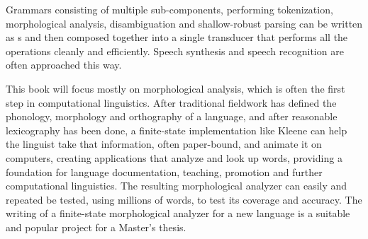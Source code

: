 Grammars consisting of multiple sub-components, performing tokenization, morphological
analysis, disambiguation and shallow-robust parsing can be written as \fst{}s and then
composed together into a single transducer that performs all the operations cleanly and
efficiently.  Speech synthesis and speech recognition are often approached this way.

This book will focus mostly on morphological analysis, which is often the first step in
computational linguistics.  After traditional fieldwork has defined the phonology,
morphology and orthography of a language, and after reasonable lexicography has been done,
a finite-state implementation like Kleene can help the linguist take that information, often paper-bound,
and animate it on
computers, creating
applications that analyze and look up words, providing a foundation for language
documentation, teaching, promotion and further computational linguistics.  The resulting
morphological analyzer can easily and repeated be tested, using millions of words, to
test its coverage and accuracy.  The writing of a finite-state
morphological
analyzer for a new language is a suitable and  popular project for a Master's thesis.


